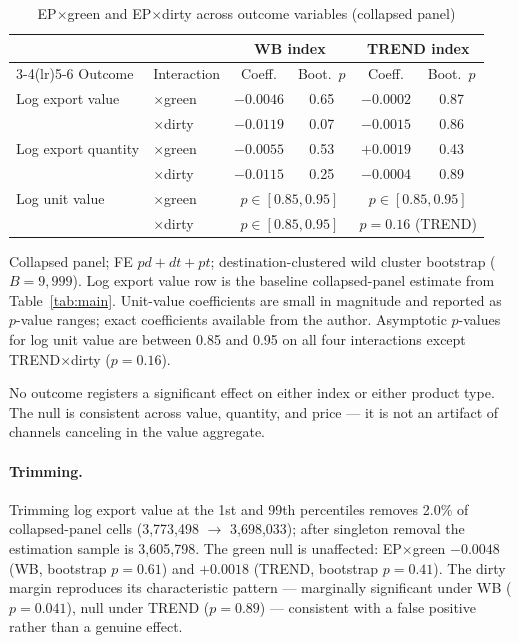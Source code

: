 \documentclass[12pt]{article}
\begin{document}
\begin{table}[htbp]
\centering
\caption{EP$\times$green and EP$\times$dirty across outcome variables (collapsed panel)}
\label{tab:outcomes}
\small
\begin{threeparttable}
\begin{tabular}{llcccc}
\toprule
 & & \multicolumn{2}{c}{WB index} & \multicolumn{2}{c}{TREND index} \\
\cmidrule(lr){3-4}\cmidrule(lr){5-6}
Outcome & Interaction & Coeff. & Boot.\ $p$ & Coeff. & Boot.\ $p$ \\
\midrule
Log export value   & $\times$green & $-0.0046$ & 0.65 & $-0.0002$ & 0.87 \\
                   & $\times$dirty & $-0.0119$ & 0.07 & $-0.0015$ & 0.86 \\
\addlinespace
Log export quantity & $\times$green & $-0.0055$ & 0.53 & $+0.0019$ & 0.43 \\
                    & $\times$dirty & $-0.0115$ & 0.25 & $-0.0004$ & 0.89 \\
\addlinespace
Log unit value     & $\times$green & \multicolumn{2}{c}{$p \in [0.85, 0.95]$} &
                                     \multicolumn{2}{c}{$p \in [0.85, 0.95]$} \\
                   & $\times$dirty & \multicolumn{2}{c}{$p \in [0.85, 0.95]$} &
                                     \multicolumn{2}{c}{$p = 0.16$ (TREND)} \\
\bottomrule
\end{tabular}
\begin{tablenotes}\footnotesize
\item Collapsed panel; FE $pd + dt + pt$; destination-clustered wild cluster bootstrap
($B = 9{,}999$). Log export value row is the baseline collapsed-panel estimate from
Table~\ref{tab:main}. Unit-value coefficients are small in magnitude and reported as
$p$-value ranges; exact coefficients available from the author. Asymptotic $p$-values
for log unit value are between 0.85 and 0.95 on all four interactions except
TREND$\times$dirty ($p = 0.16$).
\end{tablenotes}
\end{threeparttable}
\end{table}

No outcome registers a significant effect on either index or either product type. The
null is consistent across value, quantity, and price --- it is not an artifact of
channels canceling in the value aggregate.

\paragraph{Trimming.}
Trimming log export value at the 1st and 99th percentiles removes 2.0\% of collapsed-panel
cells (3{,}773{,}498 $\to$ 3{,}698{,}033); after singleton removal the estimation sample is
3{,}605{,}798. The green null is unaffected: EP$\times$green $-0.0048$ (WB, bootstrap
$p = 0.61$) and $+0.0018$ (TREND, bootstrap $p = 0.41$). The dirty margin reproduces
its characteristic pattern --- marginally significant under WB ($p = 0.041$), null under
TREND ($p = 0.89$) --- consistent with a false positive rather than a genuine effect.
\end{document}
